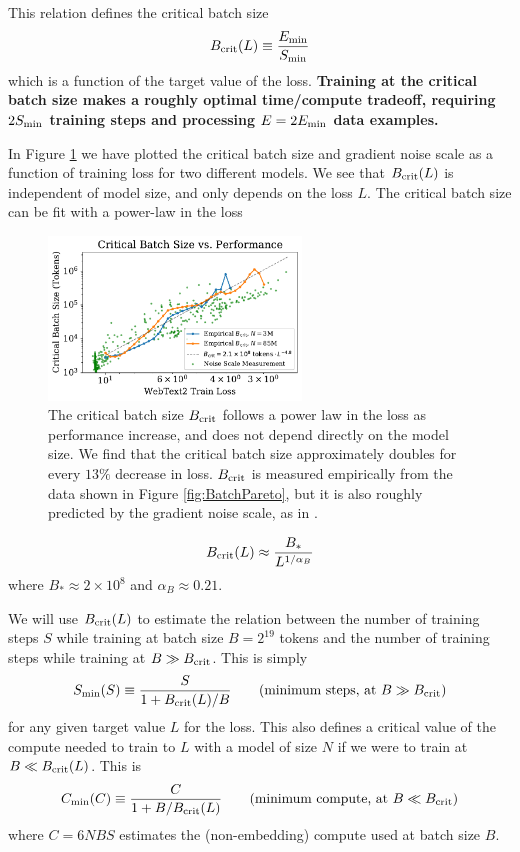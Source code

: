 \documentclass[english]{article}
\newcommand{\be}{\begin{equation}}
\newcommand{\ee}{\end{equation}}
\begin{document}
This relation defines the critical batch size 
\be
\label{eq:DefinitionBcrit}
B_{\rm crit}(L) \equiv \frac{E_{\rm min}}{S_{\rm min}}
\ee
which is a function of the target value of the loss.  \textbf{Training at the critical batch size makes a roughly optimal time/compute tradeoff, requiring $2 S_{\rm min}$ training steps and processing $E = 2 E_{\rm min}$ data examples.}  

In Figure \ref{fig:OptimalBatchSize} we have plotted the critical batch size and gradient noise scale as a function of training loss for two different models.  We see that $B_{\rm crit}(L)$ is  independent of model size, and only depends on the loss $L$.  The critical batch size can be fit with a power-law in the loss

\begin{figure}
\noindent \centering{} 
\includegraphics[width=0.60\textwidth]{CriticalBatchSizeVsPerf}
\caption[Critical batch size]{The critical batch size $B_{\rm crit}$ follows a power law in the loss as performance increase, and does not depend directly on the model size.  We find that the critical batch size approximately doubles for every $13\%$ decrease in loss.  $B_{\rm crit}$  is measured empirically from the data shown in Figure \ref{fig:BatchPareto}, but it is also roughly predicted by the gradient noise scale, as in \cite{1812.06162}.  \label{fig:OptimalBatchSize}}
\end{figure}

\be
B_{\rm crit}(L) \approx \frac{B_*}{L^{1/\alpha_B}}
\ee
where $B_* \approx 2 \times 10^8$ and $\alpha_B \approx 0.21$.   

We will use $B_{\rm crit}(L)$ to estimate the relation between the number of training steps $S$ while training at batch size $B = 2^{19}$ tokens and the number of training steps while training at $B \gg B_{\rm crit}$.  This is simply
\be
\label{eq:AdjustedSteps}
S_{\rm min}(S) \equiv \frac{S}{1 + B_{\rm crit}(L)/B} \qquad (\text{minimum steps, at } B \gg B_{\rm crit})
\ee
for any given target value $L$ for the loss.  This also defines a critical value of the compute needed to train to $L$ with a model of size $N$ if we were to train at $B \ll B_{\rm crit}(L)$. This is
\be
\label{eq:AdjustedCompute}
C_{\rm min}(C) \equiv \frac{C  }{1 + B/B_{\rm crit}(L) } \qquad (\text{minimum compute, at } B \ll B_{\rm crit})
\ee
where $C = 6 N BS$ estimates the (non-embedding) compute used at batch size $B$.
\end{document}
